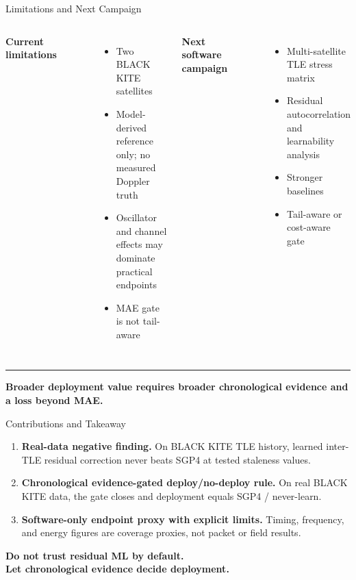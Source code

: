 \documentclass[aspectratio=169,10pt]{beamer}
\newcommand{\takeaway}[1]{%
  \vfill
  {\color{LineGray}\rule{\textwidth}{0.5pt}}\par
  \vspace{0.04cm}
  {\footnotesize\bfseries #1}
}
\begin{document}
\begin{frame}{Limitations and Next Campaign}
\begin{columns}[T,onlytextwidth]
    {\bfseries Current limitations}\\[-1pt]
    {\color{LineGray}\rule{\linewidth}{0.5pt}}\\[5pt]
    {\normalsize
    \begin{itemize}
      \item Two BLACK KITE satellites
      \item Model-derived reference only; no measured Doppler truth
      \item Oscillator and channel effects may dominate practical endpoints
      \item MAE gate is not tail-aware
    \end{itemize}}

    {\bfseries Next software campaign}\\[-1pt]
    {\color{LineGray}\rule{\linewidth}{0.5pt}}\\[5pt]
    {\normalsize
    \begin{itemize}
      \item Multi-satellite TLE stress matrix
      \item Residual autocorrelation and learnability analysis
      \item Stronger baselines
      \item Tail-aware or cost-aware gate
    \end{itemize}}
  \end{columns}
  \takeaway{Broader deployment value requires broader chronological evidence and a loss beyond MAE.}
\end{frame}

\begin{frame}{Contributions and Takeaway}
  \vspace{0.05cm}
  \begin{enumerate}
    \setlength{\itemsep}{0.34cm}
    \item \textbf{Real-data negative finding.} On BLACK KITE TLE history, learned inter-TLE residual correction never beats SGP4 at tested staleness values.
    \item \textbf{Chronological evidence-gated deploy/no-deploy rule.} On real BLACK KITE data, the gate closes and deployment equals SGP4 / never-learn.
    \item \textbf{Software-only endpoint proxy with explicit limits.} Timing, frequency, and energy figures are coverage proxies, not packet or field results.
  \end{enumerate}
  \vspace{0.35cm}
  \begin{center}
    {\Large\bfseries Do not trust residual ML by default.}\\[4pt]
    {\Large\bfseries Let chronological evidence decide deployment.}
  \end{center}
\end{frame}
\end{document}
